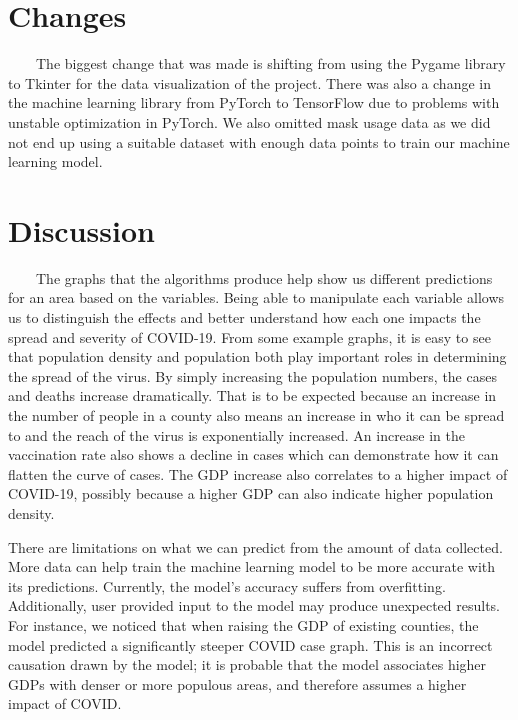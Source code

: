 \documentclass[fontsize=11pt]{article}
\begin{document}
    \section*{Changes}
    ~~~~The biggest change that was made is shifting from using the Pygame library to Tkinter for the data visualization of the project. There was also a change in the machine learning library from PyTorch to TensorFlow due to problems with unstable optimization in PyTorch. We also omitted mask usage data as we did not end up using a suitable dataset with enough data points to train our machine learning model. 


    \section*{Discussion}
    ~~~~The graphs that the algorithms produce help show us different predictions for an area based on the variables. Being able to manipulate each variable allows us to distinguish the effects and better understand how each one impacts the spread and severity of COVID-19. From some example graphs, it is easy to see that population density and population both play important roles in determining the spread of the virus. By simply increasing the population numbers, the cases and deaths increase dramatically. That is to be expected because an increase in the number of people in a county also means an increase in who it can be spread to and the reach of the virus is exponentially increased. An increase in the vaccination rate also shows a decline in cases which can demonstrate how it can flatten the curve of cases. The GDP increase also correlates to a higher impact of COVID-19, possibly because a higher GDP can also indicate higher population density. \par
    
    There are limitations on what we can predict from the amount of data collected. More data can help train the machine learning model to be more accurate with its predictions. Currently, the model's accuracy suffers from overfitting. Additionally, user provided input to the model may produce unexpected results. For instance, we noticed that when raising the GDP of existing counties, the model predicted a significantly steeper COVID case graph. This is an incorrect causation drawn by the model; it is probable that the model associates higher GDPs with denser or more populous areas, and therefore assumes a higher impact of COVID. \par
    
\end{document}
